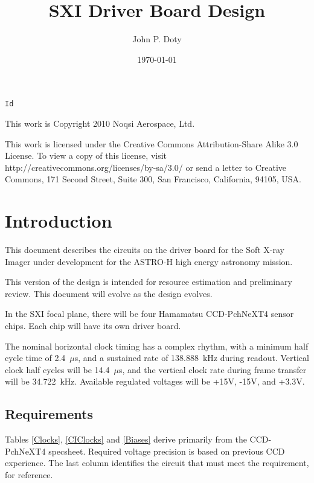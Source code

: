 \documentclass[a4paper,12pt]{article}
\author{John P. Doty}
\date{\today}
\title{SXI Driver Board Design}
\begin{document}
\begin{titlepage}
\maketitle
\begin{center}
\verb$Id$
\end{center}
\vspace{5cm}

This work is Copyright 2010 Noqsi Aerospace, Ltd.

This work is licensed under the Creative Commons Attribution-Share Alike 3.0 License. To view a copy of this license, visit http://creativecommons.org/licenses/by-sa/3.0/ or send a letter to Creative Commons, 171 Second Street, Suite 300, San Francisco, California, 94105, USA.

\end{titlepage} 

\section{Introduction}
This document describes the circuits on the driver board for the Soft X-ray Imager under development for the ASTRO-H high energy astronomy mission.

This version of the design is intended for resource estimation and preliminary review. This document will evolve as the design evolves.

In the SXI focal plane, there will be four Hamamatsu CCD-PchNeXT4 sensor chips. Each chip will have its own driver board. 

The nominal horizontal clock timing has a complex rhythm, with a minimum half cycle time of 2.4\ $\mu$s, and a sustained rate of 138.888\ kHz during readout. Vertical clock half cycles will be 14.4\ $\mu$s, and the vertical clock rate during frame transfer will be 34.722\ kHz. Available regulated voltages will be +15V, -15V, and +3.3V. 


\subsection{Requirements}
Tables \ref{Clocks}, \ref{CIClocks} and \ref{Biases} derive primarily from the CCD-PchNeXT4 specsheet. Required voltage precision is based on previous CCD experience. The last column identifies the circuit that must meet the requirement, for reference.
\end{document}
